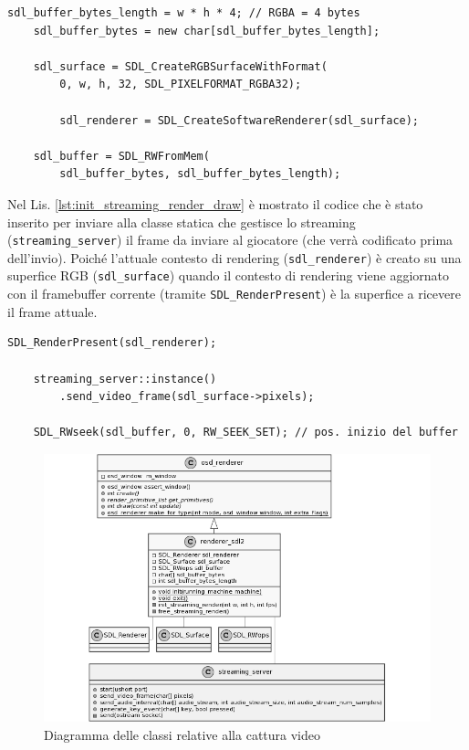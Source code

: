\begin{lstlisting}[caption=Codice aggiunto per la cattura video: inizializzazione, label={lst:init_streaming_render_init}]
	sdl_buffer_bytes_length = w * h * 4; // RGBA = 4 bytes
	sdl_buffer_bytes = new char[sdl_buffer_bytes_length];

	sdl_surface = SDL_CreateRGBSurfaceWithFormat(
		0, w, h, 32, SDL_PIXELFORMAT_RGBA32);
	
		sdl_renderer = SDL_CreateSoftwareRenderer(sdl_surface);
	
	sdl_buffer = SDL_RWFromMem(
		sdl_buffer_bytes, sdl_buffer_bytes_length);
\end{lstlisting}

Nel Lis. \ref{lst:init_streaming_render_draw} è mostrato il codice che è stato inserito per inviare alla classe statica che gestisce lo streaming (\verb|streaming_server|) il frame da inviare al giocatore (che verrà codificato prima dell'invio). Poiché l'attuale contesto di rendering (\verb|sdl_renderer|) è creato su una superfice RGB (\verb|sdl_surface|) quando il contesto di rendering viene aggiornato con il framebuffer corrente (tramite \verb|SDL_RenderPresent|) è la superfice a ricevere il frame attuale.

\begin{lstlisting}[caption=Codice aggiunto per la cattura video: disegno, label={lst:init_streaming_render_draw}]
	SDL_RenderPresent(sdl_renderer);

	streaming_server::instance()
		.send_video_frame(sdl_surface->pixels);

	SDL_RWseek(sdl_buffer, 0, RW_SEEK_SET); // pos. inizio del buffer
\end{lstlisting}

\begin{figure}[H]
	\includegraphics[width=\linewidth]{immagini/class_renderingSDLFull_Streaming}
	\caption{Diagramma delle classi relative alla cattura video}
	\label{fig:class_renderingSDLFull_Streaming}
\end{figure}

